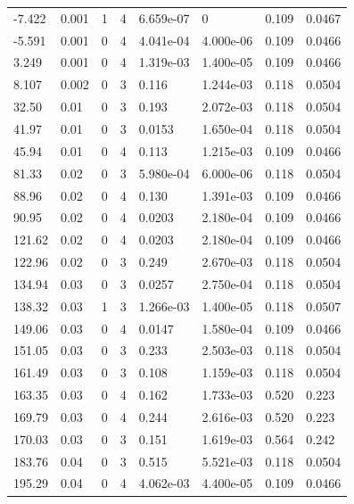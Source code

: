\documentclass[preview]{standalone}
\begin{document}
{{\begin{tabular}{L{1.2cm}C{1.2cm} C{0.3cm}C{0.5cm} C{1.4cm}C{1.4cm} C{1.4cm}C{1.4cm}}
  -7.422  &  0.001  & 1     &  4 &  6.659e-07  & 0  & 0.109 &  0.0467   \\ 
  -5.591  &  0.001  & 0     &  4 &  4.041e-04  & 4.000e-06  & 0.109 &  0.0466   \\ 
  3.249  &  0.001  & 0     &  4 &  1.319e-03  & 1.400e-05  & 0.109 &  0.0466   \\ 
  8.107  &  0.002  & 0     &  3 &  0.116  & 1.244e-03  & 0.118 &  0.0504   \\ 
  32.50  &  0.01  & 0     &  3 &  0.193  & 2.072e-03  & 0.118 &  0.0504   \\ 
  41.97  &  0.01  & 0     &  3 &  0.0153  & 1.650e-04  & 0.118 &  0.0504   \\ 
  45.94  &  0.01  & 0     &  4 &  0.113  & 1.215e-03  & 0.109 &  0.0466   \\ 
  81.33  &  0.02  & 0     &  3 &  5.980e-04  & 6.000e-06  & 0.118 &  0.0504   \\ 
  88.96  &  0.02  & 0     &  4 &  0.130  & 1.391e-03  & 0.109 &  0.0466   \\ 
  90.95  &  0.02  & 0     &  4 &  0.0203  & 2.180e-04  & 0.109 &  0.0466   \\ 
  121.62  &  0.02  & 0     &  4 &  0.0203  & 2.180e-04  & 0.109 &  0.0466   \\ 
  122.96  &  0.02  & 0     &  3 &  0.249  & 2.670e-03  & 0.118 &  0.0504   \\ 
  134.94  &  0.03  & 0     &  3 &  0.0257  & 2.750e-04  & 0.118 &  0.0504   \\ 
  138.32  &  0.03  & 1     &  3 &  1.266e-03  & 1.400e-05  & 0.118 &  0.0507   \\ 
  149.06  &  0.03  & 0     &  4 &  0.0147  & 1.580e-04  & 0.109 &  0.0466   \\ 
  151.05  &  0.03  & 0     &  3 &  0.233  & 2.503e-03  & 0.118 &  0.0504   \\ 
  161.49  &  0.03  & 0     &  3 &  0.108  & 1.159e-03  & 0.118 &  0.0504   \\ 
  163.35  &  0.03  & 0     &  4 &  0.162  & 1.733e-03  & 0.520 &  0.223   \\ 
  169.79  &  0.03  & 0     &  4 &  0.244  & 2.616e-03  & 0.520 &  0.223   \\ 
  170.03  &  0.03  & 0     &  3 &  0.151  & 1.619e-03  & 0.564 &  0.242   \\ 
  183.76  &  0.04  & 0     &  3 &  0.515  & 5.521e-03  & 0.118 &  0.0504   \\ 
  195.29  &  0.04  & 0     &  4 &  4.062e-03  & 4.400e-05  & 0.109 &  0.0466   \\ 

\end{tabular}}}
\end{document}
